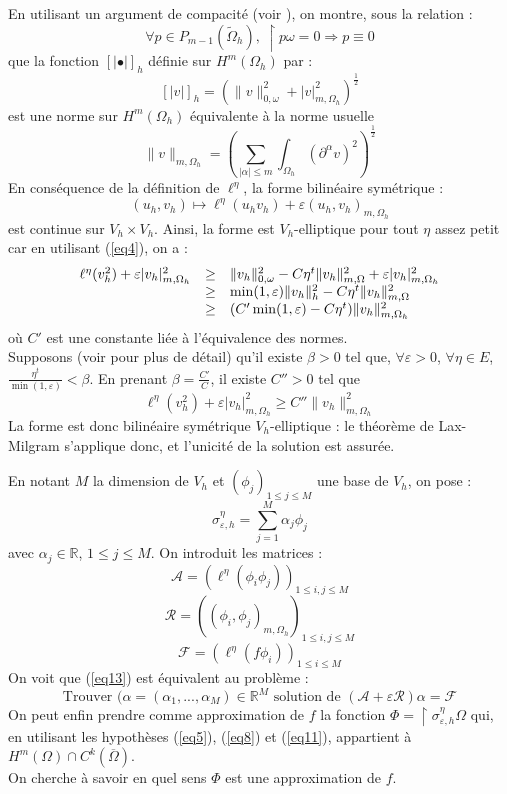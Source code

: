 \documentclass{article}
\begin{document}
\begin{dem}
En utilisant un argument de compacité (voir \cite{necas67mthd}), on montre, sous la relation :
	\[\forall p\in P_{m-1}(\tilde{\Omega}_h),\ \restriction{p}{\omega}=0\Rightarrow p\equiv 0\]
que la fonction $[|\bullet|]_h$ définie sur $H^m(\Omega_h)$ par :
	\[[|v|]_h=\left(\|v\|^2_{0,\omega}+|v|_{m,\Omega_h}^2\right)^\frac{1}{2}\]
est une norme sur $H^m(\Omega_h)$ équivalente à la norme usuelle
	\[\|v\|_{m,\Omega_h}=\left( \sum_{|\alpha|\leq m} \int_{\Omega_h} (\partial^\alpha v)^2\right)^\frac{1}{2}\]
En conséquence de la définition de $\ell^\eta$, la forme bilinéaire symétrique :
	\[(u_h,v_h)\mapsto \ell^\eta(u_hv_h)+\varepsilon (u_h,v_h)_{m,\Omega_h}\]
est continue sur $V_h\times V_h$. Ainsi, la forme est $V_h$-elliptique pour tout $\eta$ assez petit car en utilisant (\ref{eq4}), on a :
\begin{equation}\label{eq14}
\begin{array}{c c l}
	\ell^\eta(v_h^2)+\varepsilon |v_h|^2_{m,\Omega_h} &\geq& \|v_h\|_{0,\omega}^2-C\eta^t \|v_h\|^2_{m,\Omega} + \varepsilon |v_h|^2_{m,\Omega_h}\\
							&\geq& \min(1,\varepsilon)\|v_h\|_h^2-C\eta^t \|v_h\|^2_{m,\Omega} \\
							&\geq& (C'\min(1,\varepsilon)-C\eta^t)\|v_h\|^2_{m,\Omega_h}
\end{array}
\end{equation}
où $C'$ est une constante liée à l'équivalence des normes.\\
Supposons (voir \cite{arcang04multidim} pour plus de détail) qu'il existe $\beta>0$ tel que, $\forall \varepsilon>0$, $\forall \eta\in E$, $\frac{\eta^t}{\min(1,\varepsilon)}<\beta$. En prenant $\beta=\frac{C'}{C}$, il existe $C''>0$ tel que \[\ell^\eta(v_h^2)+\varepsilon |v_h|^2_{m,\Omega_h}\geq C''\|v_h\|^2_{m,\Omega_h}\]
La forme est donc bilinéaire symétrique $V_h$-elliptique : le théorème de Lax-Milgram s'applique donc, et l'unicité de la solution est assurée.
\end{dem}

\begin{rmq}
En notant $M$ la dimension de $V_h$ et $(\phi_j)_{1\leq j\leq M}$ une base de $V_h$, on pose :
	\[\sigma_{\varepsilon, h}^\eta=\sum_{j=1}^M \alpha_j \phi_j\]
avec $\alpha_j\in\mathbb{R}$, $1\leq j\leq M$. On introduit les matrices :
	\[\mathcal{A}=\left(\ell^\eta (\phi_i\phi_j)\right)_{1\leq i,j\leq M}\] 
	\[\mathcal{R}=\left((\phi_i, \phi_j)_{m,\Omega_h}\right)_{1\leq i,j\leq M}\]
	\[\mathcal{F}=\left(\ell^\eta(f\phi_i)\right)_{1\leq i\leq M}\]
On voit que (\ref{eq13}) est équivalent au problème :
	\[\text{Trouver } (\alpha=(\alpha_1,...,\alpha_M)\in\mathbb{R}^M \text{ solution de } (\mathcal{A}+\varepsilon\mathcal{R})\alpha=\mathcal{F}\]
On peut enfin prendre comme approximation de $f$ la fonction $\Phi=\restriction{\sigma_{\varepsilon,h}^\eta}{\Omega}$ qui, en utilisant les hypothèses (\ref{eq5}), (\ref{eq8}) et (\ref{eq11}), appartient à $H^m(\Omega)\cap C^k(\overline{\Omega})$.\\
On cherche à savoir en quel sens $\Phi$ est une approximation de $f$.
\end{rmq}
\end{document}
